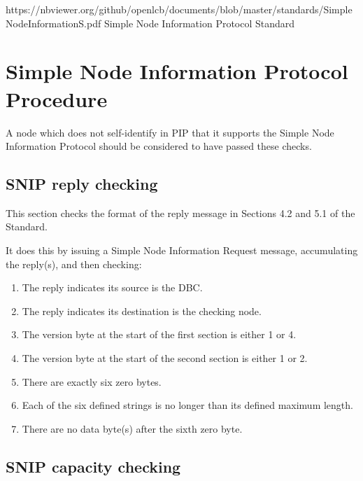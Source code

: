 



\maketitle
\thispagestyle{firststyle}

\introductionCaveats
    {https://nbviewer.org/github/openlcb/documents/blob/master/standards/SimpleNodeInformationS.pdf}
    {Simple Node Information Protocol Standard}

\section{Simple Node Information Protocol Procedure}


A node which does not self-identify in PIP that it supports
the Simple Node Information Protocol should be considered to have passed these checks.
\pipsetFootnote

\subsection{SNIP reply checking}

This section checks the format of the reply message in Sections 4.2 and 5.1 of the Standard.

It does this by issuing a Simple Node Information Request message, 
accumulating the reply(s), and then checking:
    \begin{enumerate}
    \item The reply indicates its source is the DBC.
    \item The reply indicates its destination is the checking node.
    \item The version byte at the start of the first section is either 1 or 4.
    \item The version byte at the start of the second section is either 1 or 2.
    \item There are exactly six zero bytes.
    \item Each of the six defined strings is no longer than its defined maximum length.
    \item There are no data byte(s) after the sixth zero byte.
    \end{enumerate}

\subsection{SNIP capacity checking}

